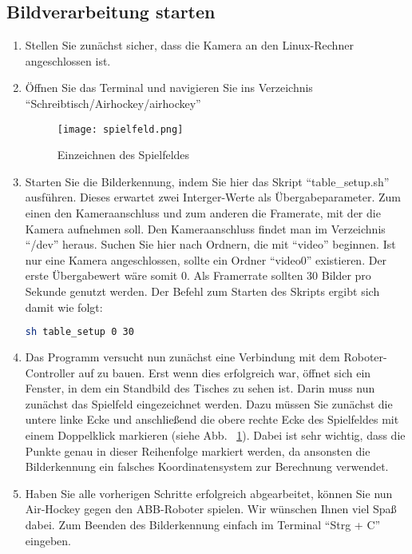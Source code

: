 \subsection{Bildverarbeitung starten}
\begin{enumerate}
\item Stellen Sie zunächst sicher, dass die Kamera an den Linux-Rechner angeschlossen ist.

\item Öffnen Sie das Terminal und navigieren Sie ins Verzeichnis \enquote{Schreibtisch/Airhockey/airhockey}


\begin{figure}[htbp]
\centering
\texttt{[image: spielfeld.png]}
\caption{Einzeichnen des Spielfeldes} 
\label{spielfeld}
\end{figure}

\item Starten Sie die Bilderkennung, indem Sie hier das Skript \enquote{table\_setup.sh} ausführen. Dieses erwartet zwei Interger-Werte als Übergabeparameter. Zum einen den Kameraanschluss und zum anderen die Framerate, mit der die Kamera aufnehmen soll. Den Kameraanschluss findet man im Verzeichnis \enquote{/dev} heraus. Suchen Sie hier nach Ordnern, die mit \enquote{video} beginnen. Ist nur eine Kamera angeschlossen, sollte ein Ordner \enquote{video0} existieren. Der erste Übergabewert wäre somit 0. Als Framerrate sollten 30 Bilder pro Sekunde genutzt werden. Der Befehl zum Starten des Skripts ergibt sich damit wie folgt:

\begin{lstlisting}[caption=Terminal-Befahl zum starten der Bilderkennung, label=start, language=bash]
sh table_setup 0 30
\end{lstlisting} 

\item Das Programm versucht nun zunächst eine Verbindung mit dem Roboter-Controller auf zu bauen. Erst wenn dies erfolgreich war, öffnet sich ein Fenster, in dem ein Standbild des Tisches zu sehen ist. Darin muss nun zunächst das Spielfeld eingezeichnet werden. Dazu müssen Sie zunächst die untere linke Ecke und anschließend die obere rechte Ecke des Spielfeldes mit einem Doppelklick markieren (siehe Abb. ~\ref{spielfeld}). Dabei ist sehr wichtig, dass die Punkte genau in dieser Reihenfolge markiert werden, da ansonsten die Bilderkennung ein falsches Koordinatensystem zur Berechnung verwendet.   

\item Haben Sie alle vorherigen Schritte erfolgreich abgearbeitet, können Sie nun Air-Hockey gegen den ABB-Roboter spielen. Wir wünschen Ihnen viel Spaß dabei. Zum Beenden des Bilderkennung einfach im Terminal \enquote{Strg + C} eingeben.   

\end{enumerate} 

